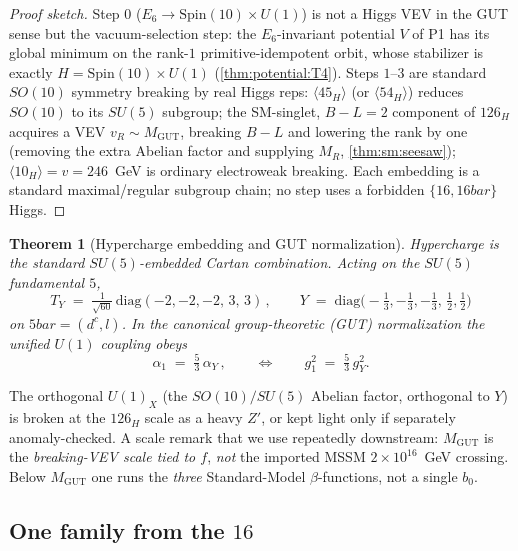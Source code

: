 \documentclass[11pt]{article}
\theoremstyle{plain}
\newtheorem{theorem}{Theorem}[section]
\theoremstyle{definition}
\theoremstyle{remark}
\begin{document}
\begin{proof}[Proof sketch]
Step $0$ ($E_6\to \mathrm{Spin}(10)\times U(1)$) is not a Higgs VEV in the GUT sense
but the vacuum-selection step: the $E_6$-invariant potential $V$ of P1 has its global
minimum on the rank-$1$ primitive-idempotent orbit, whose stabilizer is exactly
$H=\mathrm{Spin}(10)\times U(1)$ (\autoref{thm:potential:T4}). Steps $1$--$3$
are standard $SO(10)$ symmetry breaking by real Higgs reps: $\langle 45_H\rangle$ (or
$\langle 54_H\rangle$) reduces $SO(10)$ to its $SU(5)$ subgroup; the SM-singlet,
$B\!-\!L=2$ component of $126_H$ acquires a VEV $v_R\sim M_{\mathrm{GUT}}$, breaking
$B\!-\!L$ and lowering the rank by one (removing the extra Abelian factor and supplying
$M_R$, \autoref{thm:sm:seesaw}); $\langle 10_H\rangle=v=246$~GeV is ordinary
electroweak breaking. Each embedding is a standard maximal/regular subgroup chain;
no step uses a forbidden $\{16,16bar\}$ Higgs.
\end{proof}

\begin{theorem}[Hypercharge embedding and GUT normalization]\label{thm:sm:hypercharge}
Hypercharge is the standard $SU(5)$-embedded Cartan combination. Acting on the
$SU(5)$ fundamental $5$,
\begin{equation}\label{eq:sm:TY}
T_Y \;=\; \tfrac{1}{\sqrt{60}}\,\mathrm{diag}(-2,-2,-2,\,3,\,3)\,,
\qquad
Y \;=\; \mathrm{diag}\!\big(-\tfrac13,-\tfrac13,-\tfrac13,\,\tfrac12,\tfrac12\big)
\end{equation}
on $5bar=(d^c,l)$. In the canonical group-theoretic (GUT) normalization the unified
$U(1)$ coupling obeys
\begin{equation}\label{eq:sm:alpha1}
\alpha_1 \;=\; \tfrac{5}{3}\,\alpha_Y\,,
\qquad\Longleftrightarrow\qquad
g_1^2 \;=\; \tfrac{5}{3}\,g_Y^2 .
\end{equation}
\end{theorem}

The orthogonal $U(1)_X$ (the $SO(10)/SU(5)$ Abelian factor, orthogonal to $Y$) is
broken at the $126_H$ scale as a heavy $Z'$, or kept light only if separately
anomaly-checked. A scale remark that we use repeatedly downstream: $M_{\mathrm{GUT}}$
is the \emph{breaking-VEV scale tied to $f$}, \emph{not} the imported MSSM
$2\times10^{16}$~GeV crossing. Below $M_{\mathrm{GUT}}$ one runs the \emph{three}
Standard-Model $\beta$-functions, not a single $b_0$.

\subsection{One family from the \texorpdfstring{$16$}{16}}
\label{sec:sm:family}
\end{document}

